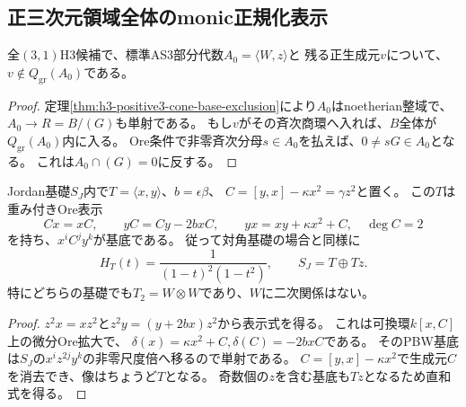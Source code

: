 \subsection{正三次元領域全体のmonic正規化表示}
\label{subsec:h3-positive3-monic-coverage}
\begin{lemma}\label{lem:h3-positive3-no-fraction}
全$(3,1)$H3候補で、標準AS3部分代数$A_0=\langle W,z\rangle$と
残る正生成元$v$について、$v\notin Q_{\mathrm{gr}}(A_0)$である。
\end{lemma}
\begin{proof}
定理\ref{thm:h3-positive3-cone-base-exclusion}により$A_0$はnoetherian整域で、
$A_0\to R=B/(G)$も単射である。
もし$v$がその斉次商環へ入れば、$B$全体が$Q_{\mathrm{gr}}(A_0)$内に入る。
Ore条件で非零斉次分母$s\in A_0$を払えば、$0\ne sG\in A_0$となる。
これは$A_0\cap(G)=0$に反する。
\end{proof}

\begin{proposition}\label{prop:h3-positive3-Jordan-cubic-base}
Jordan基礎$S_J$内で$T=\langle x,y\rangle$、$b=\epsilon\beta$、
$C=[y,x]-\kappa x^2=\gamma z^2$と置く。
この$T$は重み付きOre表示
\[
 Cx=xC,\qquad yC=Cy-2b xC,\qquad yx=xy+\kappa x^2+C,
 \quad\deg C=2
\]
を持ち、$x^iC^jy^k$が基底である。
従って対角基礎の場合と同様に
\[
 H_T(t)=\frac1{(1-t)^2(1-t^2)},\qquad S_J=T\oplus Tz.
\]
特にどちらの基礎でも$T_2=W\otimes W$であり、$W$に二次関係はない。
\end{proposition}
\begin{proof}
$z^2x=xz^2$と$z^2y=(y+2b x)z^2$から表示式を得る。
これは可換環$k[x,C]$上の微分Ore拡大で、
$\delta(x)=\kappa x^2+C,\delta(C)=-2b xC$である。
そのPBW基底は$S_J$の$x^iz^{2j}y^k$の非零尺度倍へ移るので単射である。
$C=[y,x]-\kappa x^2$で生成元$C$を消去でき、像はちょうど$T$となる。
奇数個の$z$を含む基底も$Tz$となるため直和式を得る。
\end{proof}

